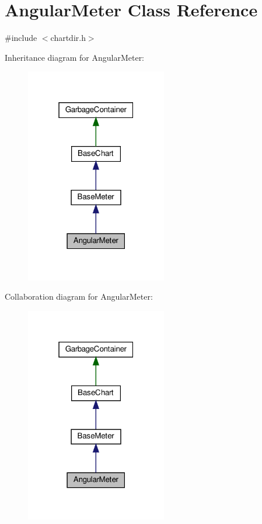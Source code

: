 \hypertarget{class_angular_meter}{}\section{Angular\+Meter Class Reference}
\label{class_angular_meter}


{\ttfamily \#include $<$chartdir.\+h$>$}



Inheritance diagram for Angular\+Meter\+:
\nopagebreak
\begin{figure}[H]
\begin{center}
\leavevmode
\includegraphics[width=175pt]{class_angular_meter__inherit__graph}
\end{center}
\end{figure}


Collaboration diagram for Angular\+Meter\+:
\nopagebreak
\begin{figure}[H]
\begin{center}
\leavevmode
\includegraphics[width=175pt]{class_angular_meter__coll__graph}
\end{center}
\end{figure}
